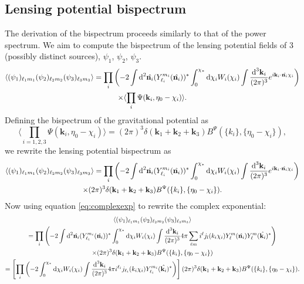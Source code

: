 \documentclass[11pt]{article} %
\DeclareRobustCommand{\d}{\ifmmode\text{d}\else d\fi}
\newcommand{\br}[1]{\ensuremath{\left( #1 \right)}}
\newcommand{\sbr}[1]{\ensuremath{\left[ #1 \right]}}
\begin{document}
\subsection{Lensing potential bispectrum}
The derivation of the bispectrum proceeds similarly to that of the power spectrum. We aim to compute the bispectrum of the lensing potential fields of 3 (possibly distinct sources), $\psi_1$, $\psi_2$, $\psi_3$. 
\begin{gather*}
    \langle (\psi_1)_{\ell_1m_1}(\psi_2)_{\ell_2m_2}(\psi_3)_{\ell_3m_3} \rangle = 
    \prod_i\br{-2\int\d^2\hat{\mathbf n_i}(Y^{m_i}_{\ell_i}(\hat{\mathbf n_i}))^*\int_0^{\chi_*}\d\chi_i W_i(\chi_i)\int\frac{\d^3\mathbf k_i}{(2\pi)^{3}}e^{i\mathbf k_i \cdot\hat{\mathbf n_i}\chi_i}} \\
    \times \langle \prod_i\Psi(\mathbf k_i, \eta_0 - \chi_i) \rangle.
\end{gather*}
Defining the bispectrum of the gravitational potential as
\begin{equation*}
    \langle \prod_{i=1,2,3}\Psi(\mathbf k_i, \eta_0 - \chi_i) \rangle = (2\pi)^3\delta(\mathbf k_1 + \mathbf k_2 + \mathbf k_3)B^\Psi(\{k_i\}, \{\eta_0-\chi_i\}),
\end{equation*}
we rewrite the lensing potential bispectrum as
\begin{gather*}
    \langle (\psi_1)_{\ell_1m_1}(\psi_2)_{\ell_2m_2}(\psi_3)_{\ell_3m_3} \rangle = 
    \prod_i\br{-2\int\d^2\hat{\mathbf n_i}(Y^{m_i}_{\ell_i}(\hat{\mathbf n_i}))^*\int_0^{\chi_*}\d\chi_i W_i(\chi_i)\int\frac{\d^3\mathbf k_i}{(2\pi)^{3}}e^{i\mathbf k_i \cdot\hat{\mathbf n_i}\chi_i}}\\ \times (2\pi)^3\delta(\mathbf k_1 + \mathbf k_2 + \mathbf k_3)B^\Psi(\{k_i\}, \{\eta_0-\chi_i\}).
\end{gather*}
Now using equation \ref{eq:complexexp} to rewrite the complex exponential:
\begin{gather*}
    \langle (\psi_1)_{\ell_1m_1}(\psi_2)_{\ell_2m_2}(\psi_3)_{\ell_3m_3} \rangle \\ = 
    \prod_i\br{-2\int\d^2\hat{\mathbf n_i}(Y^{m_i}_{\ell_i}(\hat{\mathbf n_i}))^*\int_0^{\chi_*}\d\chi_i W_i(\chi_i)\int\frac{\d^3\mathbf k_i}{(2\pi)^{3}}4\pi\sum_{\ell m}i^{\ell}j_{l}(k_i\chi_i)Y_{\ell}^{m}(\hat{\mathbf n_i})Y_{\ell}^{m}(\hat{\mathbf k_i})^*}\\
    \times (2\pi)^3\delta(\mathbf k_1 + \mathbf k_2 + \mathbf k_3)B^\Psi(\{k_i\}, \{\eta_0-\chi_i\}) \\
    = \sbr{\prod_i\br{-2\int_0^{\chi_*}\d\chi_i W_i(\chi_i)\int\frac{\d^3\mathbf k_i}{(2\pi)^{3}}4\pi i^{\ell_i}j_{\ell_i}(k_i\chi_i)Y_{\ell_i}^{m_i}(\hat{\mathbf k_i})^*}} (2\pi)^3\delta(\mathbf k_1 + \mathbf k_2 + \mathbf k_3)B^\Psi(\{k_i\}, \{\eta_0-\chi_i\}).
\end{gather*}
\end{document}
